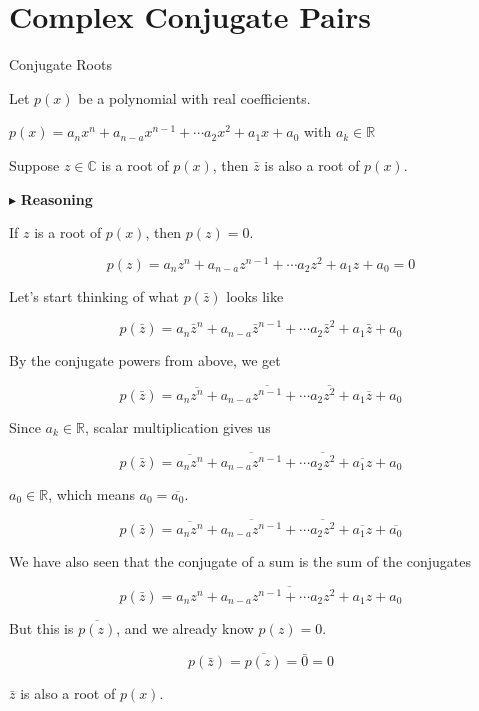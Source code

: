 \documentclass{ximera}
\begin{document}
\section{Complex Conjugate Pairs}




\begin{theorem} Conjugate Roots



Let $p(x)$ be a polynomial with real coefficients.

$p(x) = a_n x^n + a_{n-a} x^{n-1} + \cdots a_2 x^2 + a_1 x + a_0$   with $a_k \in \mathbb{R}$

Suppose $z \in \mathbb{C}$ is a root of $p(x)$, then $\bar{z}$ is also a root of $p(x)$.


\end{theorem}







$\blacktriangleright$ \textbf{Reasoning}




If $z$ is a root of $p(x)$, then $p(z) = 0$.


\[    p(z) = a_n z^n + a_{n-a} z^{n-1} + \cdots a_2 z^2 + a_1 z + a_0  = 0   \]


Let's start thinking of what $p(\bar{z})$ looks like



\[    p(\bar{z}) = a_n \bar{z}^n + a_{n-a} \bar{z}^{n-1} + \cdots a_2 \bar{z}^2 + a_1 \bar{z} + a_0    \]


By the conjugate powers from above, we get 


\[    p(\bar{z}) = a_n \overline{z^n} + a_{n-a} \overline{z^{n-1}} + \cdots a_2 \overline{z^2} + a_1 \overline{z} + a_0    \]



Since $a_k \in \mathbb{R}$, scalar multiplication gives us




\[    p(\bar{z}) = \overline{a_n z^n} +  \overline{a_{n-a} z^{n-1}} + \cdots  \overline{a_2 z^2} +  \overline{a_1 z} + a_0    \]



$a_0 \in \mathbb{R}$, which means $a_0 = \overline{a_0}$.



\[    p(\bar{z}) = \overline{a_n z^n} +  \overline{a_{n-a} z^{n-1}} + \cdots  \overline{a_2 z^2} +  \overline{a_1 z} + \overline{a_0}    \]





We have also seen that the conjugate of a sum is the sum of the conjugates


\[    p(\bar{z}) = \overline{a_n z^n + a_{n-a} z^{n-1} + \cdots  a_2 z^2 +  a_1 z + a_0}   \]



But this is $\overline{p(z)}$, and we already know  $p(z) = 0$.



\[    p(\bar{z}) = \overline{p(z)} = \bar{0} = 0  \]


$\bar{z}$ is also a root of $p(x)$.
\end{document}
